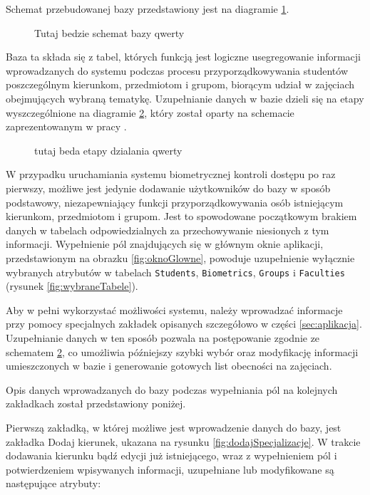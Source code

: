 Schemat przebudowanej bazy przedstawiony jest na diagramie \ref{fig:bazaDanych}.

 
\begin{figure}
\begin{center}
\caption{Tutaj bedzie schemat bazy qwerty}
\label{fig:bazaDanych}
\end{center}
\end{figure}

Baza ta składa się z tabel, których funkcją jest logiczne usegregowanie informacji wprowadzanych do systemu podczas procesu przyporządkowywania studentów poszczególnym kierunkom, przedmiotom i grupom, biorącym udział w zajęciach obejmujących wybraną tematykę. Uzupełnianie danych w bazie dzieli się na etapy wyszczególnione na diagramie \ref{fig:etapyDzialania}, który został oparty na schemacie zaprezentowanym w pracy \cite{Gl11}.

\begin{figure}
\begin{center}
\caption{tutaj beda etapy dzialania qwerty}
\label{fig:etapyDzialania}
\end{center}
\end{figure}

W przypadku uruchamiania systemu biometrycznej kontroli dostępu po raz pierwszy, możliwe jest jedynie dodawanie użytkowników do bazy w sposób podstawowy, niezapewniający funkcji przyporządkowywania osób istniejącym kierunkom, przedmiotom i grupom. Jest to spowodowane początkowym brakiem danych w tabelach odpowiedzialnych za przechowywanie niesionych z tym informacji. Wypełnienie pól znajdujących się w głównym oknie aplikacji, przedstawionym na obrazku \ref{fig:oknoGlowne}, powoduje uzupełnienie wyłącznie wybranych atrybutów w tabelach \verb!Students!, \verb!Biometrics!, \verb!Groups! i \verb!Faculties! (rysunek \ref{fig:wybraneTabele}). 

Aby w pełni wykorzystać możliwości systemu, należy wprowadzać informacje przy pomocy specjalnych zakładek opisanych szczegółowo w części \ref{sec:aplikacja}. Uzupełnianie danych w ten sposób pozwala na postępowanie zgodnie ze schematem \ref{fig:etapyDzialania}, co umożliwia późniejszy szybki wybór oraz modyfikację informacji umieszczonych w bazie i generowanie gotowych list obecności na zajęciach.

Opis danych wprowadzanych do bazy podczas wypełniania pól na kolejnych zakładkach został przedstawiony poniżej.

Pierwszą zakładką, w której możliwe jest wprowadzenie danych do bazy, jest zakładka Dodaj kierunek, ukazana na rysunku \ref{fig:dodajSpecjalizacje}. W trakcie dodawania kierunku bądź edycji już istniejącego, wraz z wypełnieniem pól i potwierdzeniem wpisywanych informacji, uzupełniane lub modyfikowane są następujące atrybuty:

